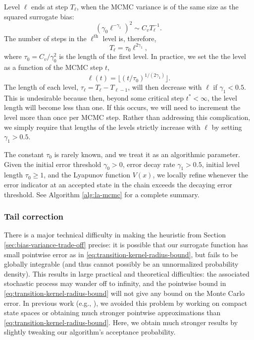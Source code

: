 Level $\ell$ ends at step $T_{\ell}$, when the MCMC variance is of the same size as the squared surrogate bias:
\begin{equation}
    \left ( \gamma_0 \ell^{-\gamma_1} \right )^2 \sim C_{v} T^{-1}_\ell.
    \label{eq:bias-variance}
\end{equation}
The number of steps in the $\ell^{\text{th}}$ level is, therefore, 
\begin{equation}
    T_{\ell} = \tau_0 \ell^{2\gamma_1},
\end{equation}
where $\tau_0 = C_v / \gamma_0^2$ is the length of the first level. In practice, we set the the level as a function of the MCMC step $t$, 
\begin{equation}
    \ell(t) = \lfloor (t/\tau_0)^{1/(2\gamma_1)} \rfloor.
    \label{eq:leveldefn}
\end{equation}
The length of each level, $\tau_{\ell} = T_{\ell}-T_{\ell-1}$, will then decrease with $\ell$ if $\gamma_1 < 0.5$. This is undesirable because then, beyond some critical step $t^* < \infty$, the level length will become less than one. If this occurs, we will need to increment the level more than once per MCMC step. Rather than addressing this complication, we simply require that lengths of the levels strictly increase with $\ell$ by setting $\gamma_1 > 0.5$. 

The constant $\tau_0$ is rarely known, and we treat it as an algorithmic parameter. Given the initial error threshold $\gamma_0>0$, error decay rate $\gamma_1>0.5$, initial level length $\tau_0 \geq 1$, and the Lyapunov function $V(x)$, we locally refine whenever the error indicator at an accepted state in the chain exceeds the decaying error threshold. See Algorithm \ref{alg:la-mcmc} for a complete summary. 

\subsubsection{Tail correction}
\label{sec:tailcorrection}

There is a major technical difficulty in making the heuristic from Section \ref{sec:bias-variance-trade-off} precise: it is possible that our surrogate function has small pointwise error as in \eqref{eq:transition-kernel-radius-bound}, but fails to be globally integrable (and thus cannot possibly be an unnormalized probability density). This results in large practical and theoretical difficulties: the associated stochastic process may wander off to infinity, and the pointwise bound in \eqref{eq:transition-kernel-radius-bound} will not give any bound on the Monte Carlo error. In previous work (e.g., \citet{Conradetal2016}), we avoided this problem by working on compact state spaces or obtaining much stronger pointwise approximations than \eqref{eq:transition-kernel-radius-bound}. Here, we obtain much stronger results by slightly tweaking our algorithm's acceptance probability.

